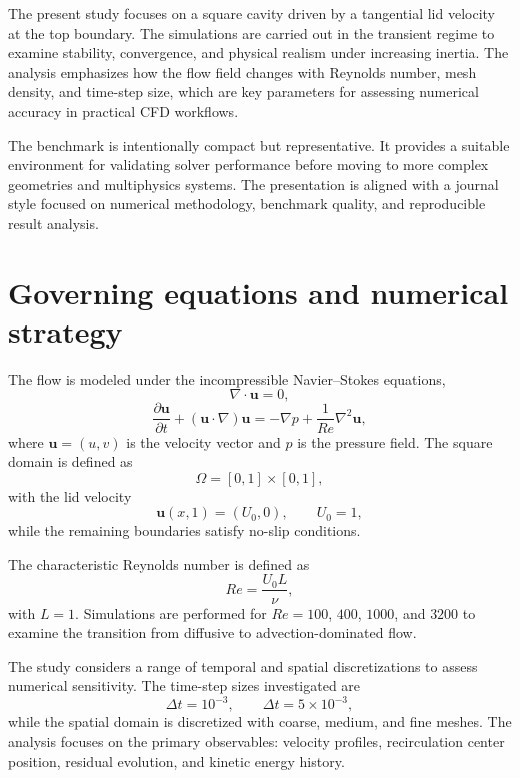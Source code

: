 \documentclass[final,3p,times]{elsarticle}
\begin{document}
The present study focuses on a square cavity driven by a tangential lid velocity at the top boundary. The simulations are carried out in the transient regime to examine stability, convergence, and physical realism under increasing inertia. The analysis emphasizes how the flow field changes with Reynolds number, mesh density, and time-step size, which are key parameters for assessing numerical accuracy in practical CFD workflows.

The benchmark is intentionally compact but representative. It provides a suitable environment for validating solver performance before moving to more complex geometries and multiphysics systems. The presentation is aligned with a journal style focused on numerical methodology, benchmark quality, and reproducible result analysis.

\section{Governing equations and numerical strategy}

The flow is modeled under the incompressible Navier--Stokes equations,
\begin{equation}
\nabla \cdot \mathbf{u} = 0,
\end{equation}
\begin{equation}
\frac{\partial \mathbf{u}}{\partial t} + (\mathbf{u} \cdot \nabla)\mathbf{u} = -\nabla p + \frac{1}{Re} \nabla^2 \mathbf{u},
\end{equation}
where $\mathbf{u} = (u,v)$ is the velocity vector and $p$ is the pressure field. The square domain is defined as
\begin{equation}
\Omega = [0,1] \times [0,1],
\end{equation}
with the lid velocity
\begin{equation}
\mathbf{u}(x,1) = (U_0,0), \qquad U_0 = 1,
\end{equation}
while the remaining boundaries satisfy no-slip conditions.

The characteristic Reynolds number is defined as
\begin{equation}
Re = \frac{U_0 L}{\nu},
\end{equation}
with $L=1$. Simulations are performed for $Re = 100$, $400$, $1000$, and $3200$ to examine the transition from diffusive to advection-dominated flow.

The study considers a range of temporal and spatial discretizations to assess numerical sensitivity. The time-step sizes investigated are
\begin{equation}
\Delta t = 10^{-3}, \qquad \Delta t = 5\times 10^{-3},
\end{equation}
while the spatial domain is discretized with coarse, medium, and fine meshes. The analysis focuses on the primary observables: velocity profiles, recirculation center position, residual evolution, and kinetic energy history.
\end{document}
